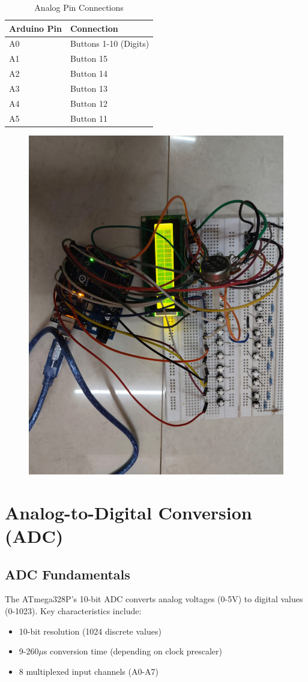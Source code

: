 \documentclass[journal]{IEEEtran}
\begin{document}
\begin{table}[H]
\centering
\caption{Analog Pin Connections}
\label{tab:analog_connections}
\begin{tabular}{ll}
\textbf{Arduino Pin} & \textbf{Connection} \\
\hline
A0 & Buttons 1-10 (Digits) \\
A1 & Button 15 \\
A2 & Button 14 \\
A3 & Button 13 \\
A4 & Button 12 \\
A5 & Button 11 \\
\end{tabular}
\end{table}
\begin{figure}
    \centering
    \includegraphics[width=0.5\linewidth]{fig/ckt.jpeg}
    \label{fig:enter-label}
\end{figure}

\section{Analog-to-Digital Conversion (ADC)}

\subsection{ADC Fundamentals}
The ATmega328P's 10-bit ADC converts analog voltages (0-5V) to digital values (0-1023). Key characteristics include:
\begin{itemize}
    \item 10-bit resolution (1024 discrete values)
    \item 9-260$\mu$s conversion time (depending on clock prescaler)
    \item 8 multiplexed input channels (A0-A7)
\end{itemize}
\end{document}
